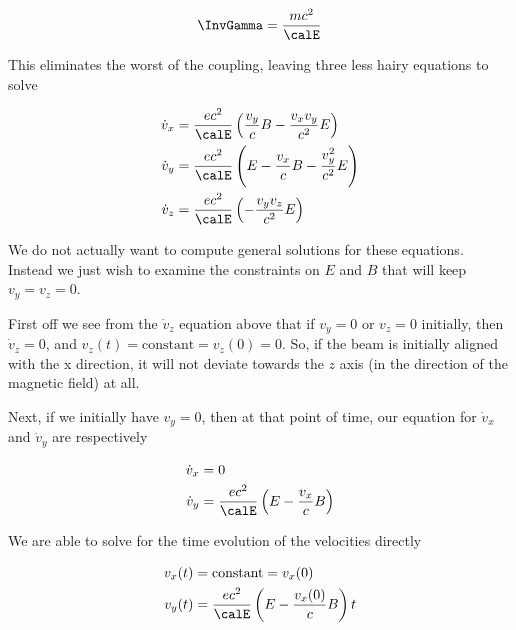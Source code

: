{\begin{equation}\label{eqn:relElectroDynProblemSet2:330}
\InvGamma = \frac{ m c^2 }{\calE}
\end{equation}

This eliminates the worst of the coupling, leaving three less hairy equations to solve

\begin{equation}\label{eqn:relElectroDynProblemSet2:350}
\begin{aligned}
\dot{v}_x &= \frac{e c^2}{\calE} \left( \frac{v_y}{c} B - \frac{v_x v_y}{c^2} E \right) \\
\dot{v}_y &= \frac{e c^2}{\calE} \left( E - \frac{v_x}{c} B - \frac{v_y^2}{c^2} E \right) \\
\dot{v}_z &= \frac{e c^2}{\calE} \left( - \frac{v_y v_z}{c^2} E \right)
\end{aligned}
\end{equation}

We do not actually want to compute general solutions for these equations.  Instead we just wish to examine the constraints on \(E\) and \(B\) that will keep \(v_y = v_z = 0\).

First off we see from the \(\dot{v}_z\) equation above that if \(v_y = 0\) or \(v_z = 0\) initially, then \(\dot{v}_z = 0\), and \(v_z(t) = \text{constant} = v_z(0) = 0\).  So, if the beam is initially aligned with the x direction, it will not deviate towards the \(z\) axis (in the direction of the magnetic field) at all.

Next, if we initially have \(v_y = 0\), then at that point of time, our equation for \(\dot{v}_x\) and \(\dot{v}_y\) are respectively

\begin{equation}\label{eqn:relElectroDynProblemSet2:370}
\begin{aligned}
\dot{v}_x &= 0 \\
\dot{v}_y &= \frac{e c^2}{\calE} \left( E - \frac{v_x}{c} B \right) 
\end{aligned}
\end{equation}

We are able to solve for the time evolution of the velocities directly

\begin{equation}\label{eqn:relElectroDynProblemSet2:390}
\begin{aligned}
v_x(t) &= \text{constant} = v_x(0) \\
v_y(t) &= \frac{e c^2}{\calE} \left( E - \frac{v_x(0)}{c} B \right) t
\end{aligned}
\end{equation}

}
